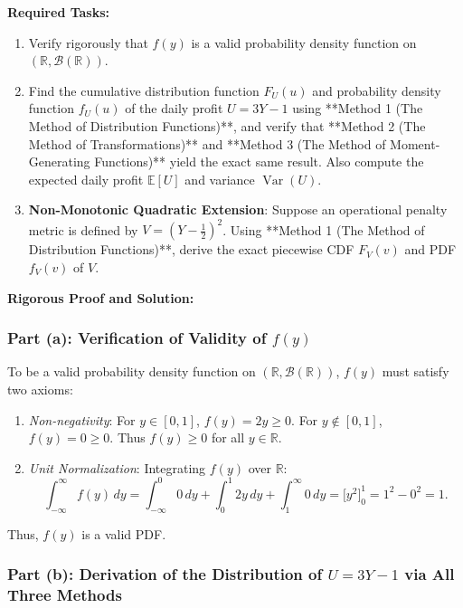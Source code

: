 \documentclass[11pt, letterpaper]{article}
\theoremstyle{definition}
\theoremstyle{remark}
\newcommand{\R}{\mathbb{R}}
\newcommand{\E}{\mathbb{E}}
\begin{document}
\textbf{Required Tasks:}
\begin{enumerate}[label=(\alph*)]
    \item Verify rigorously that $f(y)$ is a valid probability density function on $(\R, \mathcal{B}(\R))$.
    \item Find the cumulative distribution function $F_U(u)$ and probability density function $f_U(u)$ of the daily profit $U = 3Y - 1$ using **Method 1 (The Method of Distribution Functions)**, and verify that **Method 2 (The Method of Transformations)** and **Method 3 (The Method of Moment-Generating Functions)** yield the exact same result. Also compute the expected daily profit $\E[U]$ and variance $\operatorname{Var}(U)$.
    \item \textbf{Non-Monotonic Quadratic Extension}: Suppose an operational penalty metric is defined by $V = \left(Y - \frac{1}{2}\right)^2$. Using **Method 1 (The Method of Distribution Functions)**, derive the exact piecewise CDF $F_V(v)$ and PDF $f_V(v)$ of $V$.
\end{enumerate}

\hr
\textbf{Rigorous Proof and Solution:}

\subsubsection*{Part (a): Verification of Validity of $f(y)$}
To be a valid probability density function on $(\R, \mathcal{B}(\R))$, $f(y)$ must satisfy two axioms:
\begin{enumerate}[label=\textbf{\arabic*.}]
    \item \textit{Non-negativity}: For $y \in [0, 1]$, $f(y) = 2y \ge 0$. For $y \notin [0, 1]$, $f(y) = 0 \ge 0$. Thus $f(y) \ge 0$ for all $y \in \R$.
    \item \textit{Unit Normalization}: Integrating $f(y)$ over $\R$:
    \[
        \int_{-\infty}^{\infty} f(y) \, dy = \int_{-\infty}^0 0 \, dy + \int_0^1 2y \, dy + \int_1^{\infty} 0 \, dy = \Big[y^2\Big]_0^1 = 1^2 - 0^2 = 1.
    \]
\end{enumerate}
Thus, $f(y)$ is a valid PDF.

\subsubsection*{Part (b): Derivation of the Distribution of $U = 3Y - 1$ via All Three Methods}
\end{document}
